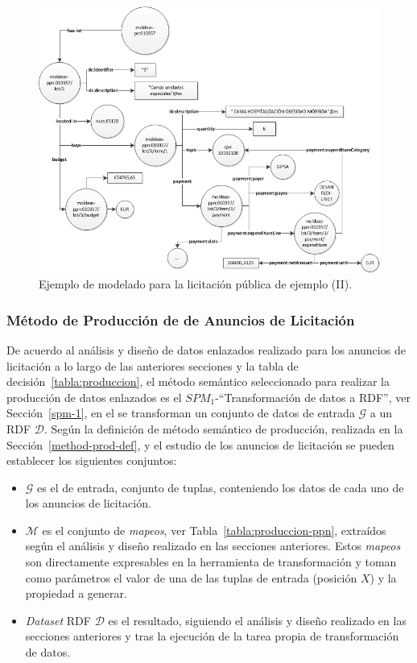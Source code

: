 \begin{figure}[!htp]
    \centering
	\includegraphics[width=16cm]{images/phd/modelo/hospital-2}
	\caption{Ejemplo de modelado para la licitación pública de ejemplo (II).}
	\label{fig:modelo-hospital-2}
\end{figure}
%

\subsubsection{Método de Producción de \linkeddata de Anuncios de Licitación}
De acuerdo al análisis y diseño de datos enlazados realizado para los anuncios de licitación
a lo largo de las anteriores secciones y la tabla de decisión~\ref{tabla:produccion}, el método semántico seleccionado 
para realizar la producción de datos enlazados es el $SPM_1$-``Transformación de datos a RDF'', ver Sección~\ref{spm-1}, en el 
se transforman un conjunto de datos de entrada $\mathcal{G}$ a un \dataset RDF $\mathcal{D}$. Según la definición de método 
semántico de producción, realizada en la Sección~\ref{method-prod-def}, y el estudio de los anuncios de licitación se pueden 
establecer los siguientes conjuntos:
\begin{itemize}
 \item $\mathcal{G}$ es el \dataset de entrada, conjunto de tuplas, conteniendo los datos de cada uno de los anuncios de licitación.
 \item $\mathcal{M}$ es el conjunto de \textit{mapeos}, ver Tabla~\ref{tabla:produccion-ppn}, extraídos según el análisis y diseño realizado en las secciones anteriores. Estos 
\textit{mapeos} son directamente expresables en la herramienta de transformación y toman como parámetros el valor de una de las tuplas de entrada (posición $X$) y la propiedad a generar.
 \item \textit{Dataset} \gls{RDF} $\mathcal{D}$ es el \dataset resultado, siguiendo el análisis y diseño realizado en las secciones anteriores y tras la ejecución 
de la tarea propia de transformación de datos.
\end{itemize}
% 

